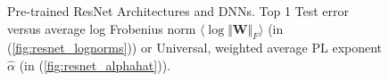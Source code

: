 \begin{figure}[!htb]
   \centering
   \caption{
      Pre-trained
      ResNet Architectures and DNNs.  
      Top 1 Test error versus
      average log Frobenius norm $\langle\log\Vert\mathbf{W}\Vert_{F}\rangle$ (in (\ref{fig:resnet_lognorms}))
      or
      Universal, weighted average PL exponent $\hat{\alpha}$ (in (\ref{fig:resnet_alphahat})).
           }
   \label{fig:resnet}
\end{figure}

